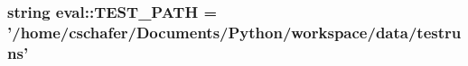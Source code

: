 \hypertarget{namespaceeval_257985d7d7884932360c75335c8e5052}{
\subsubsection[{TEST\_\-PATH}]{\setlength{\rightskip}{0pt plus 5cm}string {\bf eval::TEST\_\-PATH} = '/home/cschafer/Documents/Python/workspace/{\bf data}/testruns'}}
\label{namespaceeval_257985d7d7884932360c75335c8e5052}


